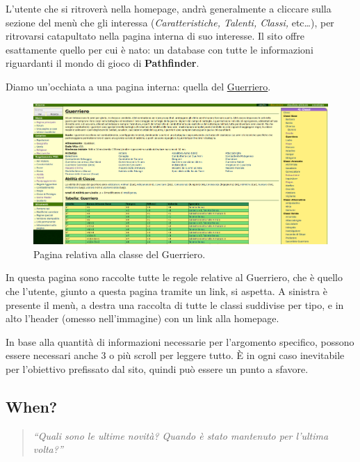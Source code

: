 L'utente che si ritroverà nella homepage, andrà generalmente a cliccare sulla sezione del menù che gli interessa (\emph{Caratteristiche, %
Talenti, Classi,} etc\dots), per ritrovarsi catapultato nella pagina interna di suo interesse. Il sito offre esattamente quello
per cui è nato: un database con tutte le informazioni riguardanti il mondo di gioco di \textbf{Pathfinder}.

\newpage
Diamo un'occhiata a una pagina interna: quella del \href{http://golarion.altervista.org/wiki/Guerriero}{Guerriero}.

\begin{figure}[hbt]
    \centering
    \includegraphics[width=\textwidth]{img/guerriero.png}
    \caption{Pagina relativa alla classe del Guerriero.}
    \label{fig:guerriero}
\end{figure}

In questa pagina sono raccolte tutte le regole relative al Guerriero, che è quello che l'utente, giunto a questa pagina tramite un link, si aspetta.
A sinistra è presente il menù, a destra una raccolta di tutte le classi suddivise per tipo, e in alto l'header (omesso nell'immagine) 
con un link alla homepage.\par
In base alla quantità di informazioni necessarie per l'argomento specifico, possono essere necessari anche 3 o più
scroll per leggere tutto. È in ogni caso inevitabile per l'obiettivo prefissato dal sito, quindi può essere
un punto a sfavore.

\clearpage

\subsection{When?}
\begin{quote}
    \emph{``Quali sono le ultime novità? Quando è stato mantenuto per l'ultima volta?''}
\end{quote}

